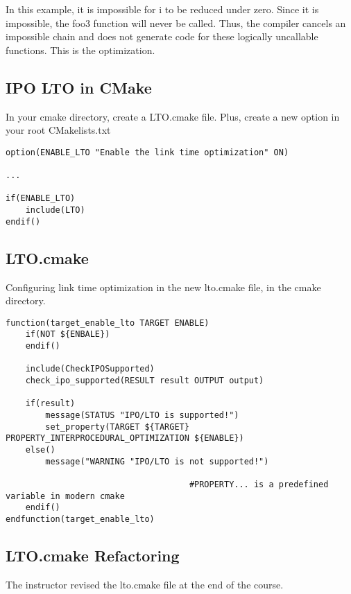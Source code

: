 \documentclass[openany]{report}
\begin{document}
In this example, it is impossible for i to be reduced under zero. Since it is impossible, the foo3 function will never be
called. Thus, the compiler cancels an impossible chain and does not generate code for these logically uncallable functions.
This is the optimization.

\subsection{IPO LTO in CMake}

In your cmake directory, create a LTO.cmake file. Plus, create a new option in your root CMakelists.txt


\begin{verbatim}
option(ENABLE_LTO "Enable the link time optimization" ON)

...

if(ENABLE_LTO)
    include(LTO)
endif()
\end{verbatim}


\subsection{LTO.cmake}

Configuring link time optimization in the new lto.cmake file, in the cmake directory.

\begin{verbatim}
function(target_enable_lto TARGET ENABLE)
    if(NOT ${ENBALE})
    endif()

    include(CheckIPOSupported)
    check_ipo_supported(RESULT result OUTPUT output)

    if(result) 
        message(STATUS "IPO/LTO is supported!")
        set_property(TARGET ${TARGET} PROPERTY_INTERPROCEDURAL_OPTIMIZATION ${ENABLE})
    else()
        message("WARNING "IPO/LTO is not supported!")

                                     #PROPERTY... is a predefined variable in modern cmake
    endif()
endfunction(target_enable_lto)
\end{verbatim}

\subsection{LTO.cmake Refactoring}

The instructor revised the lto.cmake file at the end of the course.
\end{document}
